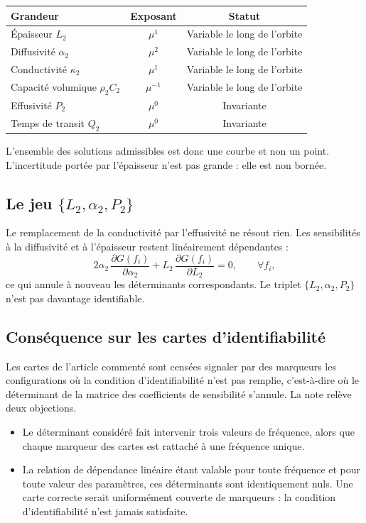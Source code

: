 \documentclass[11pt,a4paper]{article}
\begin{document}
\begin{center}
\begin{tabular}{@{}lcc@{}}
\toprule
\textbf{Grandeur} & \textbf{Exposant} & \textbf{Statut} \\
\midrule
Épaisseur $L_{2}$ & $\mu^{1}$ & Variable le long de l'orbite \\
Diffusivité $\alpha_{2}$ & $\mu^{2}$ & Variable le long de l'orbite \\
Conductivité $\kappa_{2}$ & $\mu^{1}$ & Variable le long de l'orbite \\
Capacité volumique $\rho_{2}C_{2}$ & $\mu^{-1}$ & Variable le long de l'orbite \\
Effusivité $P_{2}$ & $\mu^{0}$ & Invariante \\
Temps de transit $Q_{2}$ & $\mu^{0}$ & Invariante \\
\bottomrule
\end{tabular}
\end{center}

L'ensemble des solutions admissibles est donc une courbe et non un point. L'incertitude portée par
l'épaisseur n'est pas grande : elle est non bornée.

\subsection{Le jeu $\{L_{2},\alpha_{2},P_{2}\}$}

Le remplacement de la conductivité par l'effusivité ne résout rien. Les sensibilités à la diffusivité et
à l'épaisseur restent linéairement dépendantes :
\[ 2\alpha_{2}\,\frac{\partial G(f_{i})}{\partial\alpha_{2}}
+ L_{2}\,\frac{\partial G(f_{i})}{\partial L_{2}} = 0 , \qquad\forall f_{i} , \]
ce qui annule à nouveau les déterminants correspondants. Le triplet $\{L_{2},\alpha_{2},P_{2}\}$ n'est
pas davantage identifiable.

\subsection{Conséquence sur les cartes d'identifiabilité}

Les cartes de l'article commenté sont censées signaler par des marqueurs les configurations où la
condition d'identifiabilité n'est pas remplie, c'est-à-dire où le déterminant de la matrice des
coefficients de sensibilité s'annule. La note relève deux objections.

\begin{itemize}
\item Le déterminant considéré fait intervenir trois valeurs de fréquence, alors que chaque marqueur des
cartes est rattaché à une fréquence unique.
\item La relation de dépendance linéaire étant valable pour toute fréquence et pour toute valeur des
paramètres, ces déterminants sont identiquement nuls. Une carte correcte serait uniformément couverte de
marqueurs : la condition d'identifiabilité n'est jamais satisfaite.
\end{itemize}
\end{document}
